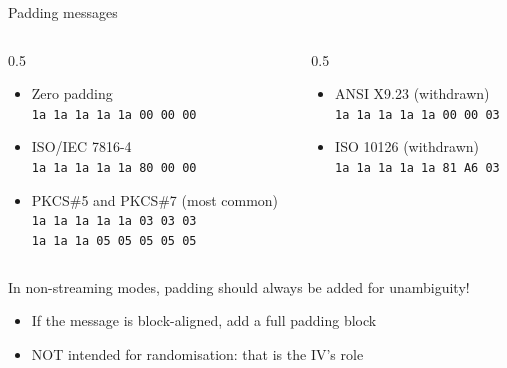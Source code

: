 \begin{frame}{Padding messages}
  \begin{columns}
    \begin{column}{0.5\textwidth}
      \begin{itemize}[<+(1)->]
        \item Zero padding\\
        \texttt{1a 1a 1a 1a 1a 00 00 00}
        \item ISO/IEC 7816-4\\
        \texttt{1a 1a 1a 1a 1a 80 00 00}
        \item PKCS\#5 and PKCS\#7 (most common)\\
        \texttt{1a 1a 1a 1a 1a 03 03 03}\\
        \texttt{1a 1a 1a 05 05 05 05 05}
      \end{itemize}
    \end{column}
    \begin{column}{0.5\textwidth}
      \begin{itemize}[<+(1)->]
        \item ANSI X9.23 (withdrawn)\\
        \texttt{1a 1a 1a 1a 1a 00 00 03}
        \item ISO 10126 (withdrawn)\\
        \texttt{1a 1a 1a 1a 1a 81 A6 03}
      \end{itemize}
    \end{column}
  \end{columns}

  \vspace*{1em}

  \pause
  In non-streaming modes, padding should always be added for unambiguity!
  \begin{itemize}[<+(1)->]
    \item If the message is block-aligned, add a full padding block
    \item NOT intended for randomisation: that is the IV's role
  \end{itemize}
\end{frame}

